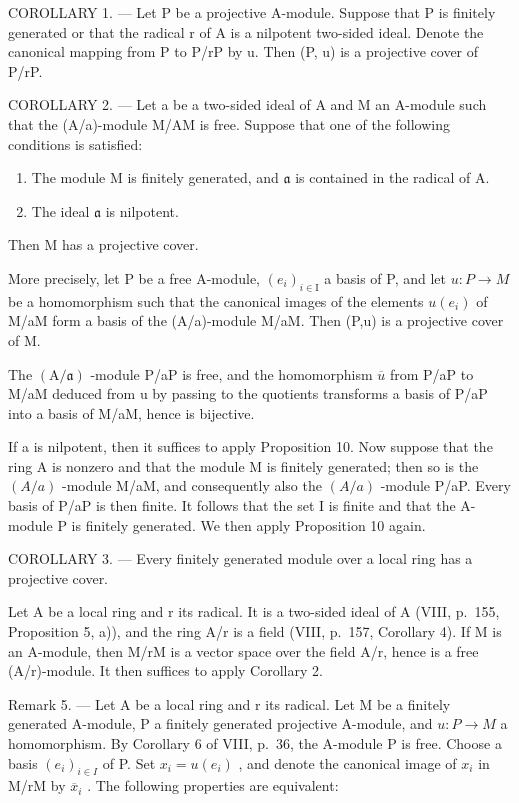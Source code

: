 COROLLARY 1. --- Let P be a projective A-module. Suppose that P is finitely generated or that the radical r of A is a nilpotent two-sided ideal. Denote the canonical mapping from P to P/rP by u. Then (P, u) is a projective cover of P/rP.

COROLLARY 2. --- Let a be a two-sided ideal of A and M an A-module such that the (A/a)-module M/AM is free. Suppose that one of the following conditions is satisfied:

\begin{enumerate}
\def\labelenumi{(\roman{enumi})}
\item
  The module M is finitely generated, and \(\mathfrak{a}\) is contained in the radical of A.
\item
  The ideal \(\mathfrak{a}\) is nilpotent.
\end{enumerate}

Then M has a projective cover.

More precisely, let P be a free A-module, \((e_{i})_{i\in\mathrm{I}}\) a basis of P, and let \(u:P\to M\) be a homomorphism such that the canonical images of the elements \(u(e_{i})\) of M/aM form a basis of the (A/a)-module M/aM. Then (P,u) is a projective cover of M.

The \((\mathrm{A}/\mathfrak{a})\) -module P/aP is free, and the homomorphism \(\overline{u}\) from P/aP to M/aM deduced from u by passing to the quotients transforms a basis of P/aP into a basis of M/aM, hence is bijective.

If a is nilpotent, then it suffices to apply Proposition 10. Now suppose that the ring A is nonzero and that the module M is finitely generated; then so is the \((A/a)\) -module M/aM, and consequently also the \((A/a)\) -module P/aP. Every basis of P/aP is then finite. It follows that the set I is finite and that the A-module P is finitely generated. We then apply Proposition 10 again.

COROLLARY 3. --- Every finitely generated module over a local ring has a projective cover.

Let A be a local ring and r its radical. It is a two-sided ideal of A (VIII, p.~155, Proposition 5, a)), and the ring A/r is a field (VIII, p.~157, Corollary 4). If M is an A-module, then M/rM is a vector space over the field A/r, hence is a free (A/r)-module. It then suffices to apply Corollary 2.

Remark 5. --- Let A be a local ring and r its radical. Let M be a finitely generated A-module, P a finitely generated projective A-module, and \(u : P \to M\) a homomorphism. By Corollary 6 of VIII, p.~36, the A-module P is free. Choose a basis \((e_{i})_{i \in I}\) of P. Set \(x_{i} = u(e_{i})\) , and denote the canonical image of \(x_{i}\) in M/rM by \(\overline{x}_{i}\) . The following properties are equivalent:


